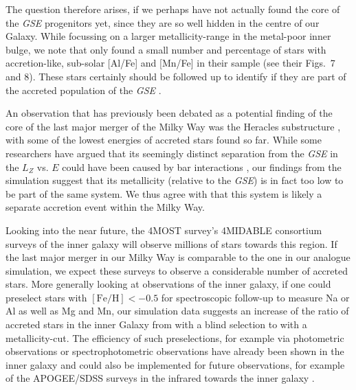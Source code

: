 \documentclass[fleqn,usenatbib]{mnras}
\begin{document}
The question therefore arises, if we perhaps have not actually found the core of the \textit{GSE} progenitors yet, since they are so well hidden in the centre of our Galaxy. While focussing on a larger metallicity-range in the metal-poor inner bulge, we note that \citet{Lucey2022} only found a small number and percentage of stars with accretion-like, sub-solar [Al/Fe] and [Mn/Fe] in their sample (see their Figs.~7 and 8). These stars certainly should be followed up to identify if they are part of the accreted population of the \textit{GSE} \citep[see also][]{Kunder2025}.

An observation that has previously been debated as a potential finding of the core of the last major merger of the Milky Way was the Heracles substructure \citep{Horta2021}, with some of the lowest energies of accreted stars found so far. While some researchers have argued that its seemingly distinct separation from the \textit{GSE} in the $L_Z$ vs. $E$ could have been caused by bar interactions \citep{Dillamore2025}, our findings from the simulation suggest that its metallicity (relative to the \textit{GSE}) is in fact too low to be part of the same system. We thus agree with \citet{Horta2021} that this system is likely a separate accretion event within the Milky Way.

Looking into the near future, the 4MOST survey's 4MIDABLE consortium surveys of the inner galaxy \citep{4MOST_HR_DiskBulge, 4MOST_LR_DiskBulge} will observe millions of stars towards this region. If the last major merger in our Milky Way is comparable to the one in our analogue simulation, we expect these surveys to observe a considerable number of accreted stars. More generally looking at observations of the inner galaxy, if one could preselect stars with $\mathrm{[Fe/H]} < -0.5$ for spectroscopic follow-up to measure Na or Al as well as Mg and Mn, our simulation data suggests an increase of the ratio of accreted stars in the inner Galaxy from  with a blind selection to  with a metallicity-cut. The efficiency of such preselections, for example via photometric observations \citep[for example from the Pristine and SkyMapper surveys][]{Starkenburg2017, DaCosta2019} or spectrophotometric observations \citep[for example by combining \textit{Gaia} BP/RP spectrophotometry and narrow-band Pristine photometry][]{Martin2024} have already been shown in the inner galaxy \citep[for example by][with the Pristine Inner Galaxy Survey]{Arentsen2020, Arentsen2020b} and could also be implemented for future observations, for example of the APOGEE/SDSS surveys in the infrared towards the inner galaxy \citep{Santana2021}.
\end{document}
